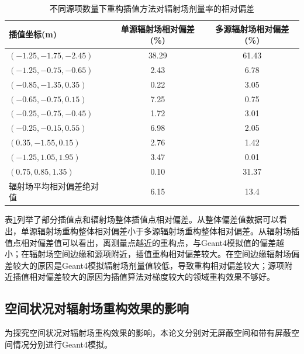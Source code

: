 \begin{table}[htbp]
    \centering
    \caption{\label{tab:test1}不同源项数量下重构插值方法对辐射场剂量率的相对偏差}
    \begin{tabular}{lcc}
        \toprule
        插值坐标(m)              & 单源辐射场相对偏差(\%) & 多源辐射场相对偏差(\%) \\
        \midrule
        $ (-1.25,-1.75,-2.45) $  & 38.29                  & 61.43                  \\
        $ (-1.25,-0.75,-0.65) $  & 2.43                   & 6.78                   \\
        $ (-0.85,-1.35,0.35) $   & 0.22                   & 3.05                   \\
        $ (-0.65,-0.75,0.15) $   & 7.25                   & 0.75                   \\
        $ (-0.25,-0.75,-0.45) $  & 1.72                   & 3.01                   \\
        $ (-0.25,-0.15,0.55) $   & 6.98                   & 2.05                   \\
        $ (0.35,-1.55,0.15) $    & 2.76                   & 1.42                   \\
        $ (-1.25,1.05,1.95) $    & 3.47                   & 0.01                   \\
        $ (0.75,0.85,1.35) $     & 0.10                   & 31.37                  \\
        辐射场平均相对偏差绝对值 & 6.15                   & 13.4                   \\
        \bottomrule
    \end{tabular}
    \label{不同源项数量下重构插值方法对辐射场剂量率的相对偏差}
\end{table}

表\ref{不同源项数量下重构插值方法对辐射场剂量率的相对偏差}列举了部分插值点和辐射场整体插值点相对偏差。从整体偏差值数据可以看出，单源辐射场重构整体相对偏差小于多源辐射场重构整体相对偏差。从辐射场插值点相对偏差值可以看出，离测量点越近的重构点，与Geant4模拟值的偏差越小；在辐射场空间边缘和源项附近，插值重构相对偏差较大。在空间边缘辐射场偏差较大的原因是Geant4模拟辐射场剂量值较低，导致重构相对偏差较大；源项附近插值相对偏差较大的原因为插值算法对梯度较大的领域重构效果不够好。

\subsection{空间状况对辐射场重构效果的影响}
为探究空间状况对辐射场重构效果的影响，本论文分别对无屏蔽空间和带有屏蔽空间情况分别进行Geant4模拟。

